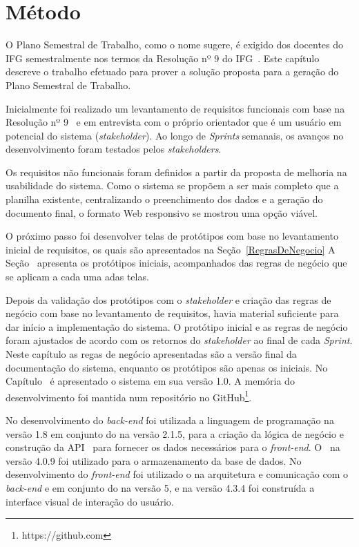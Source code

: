 \chapter{Método}
\label{Metodo}
\indent

O Plano Semestral de Trabalho, como o nome sugere, é exigido dos docentes do \ac{IFG} semestralmente nos termos da Resolução nº 9 do \ac{IFG}~\citep{resolucao}.
Este capítulo descreve o trabalho efetuado para prover a solução proposta para a geração do Plano Semestral de Trabalho.

Inicialmente foi realizado um levantamento de requisitos funcionais com base na Resolução nº 9~\citep{resolucao} e em entrevista com o próprio orientador que é um usuário em potencial do sistema (\textit{stakeholder}).
Ao longo de \textit{Sprints} semanais, os avanços no desenvolvimento foram testados pelos \textit{stakeholders}.

Os requisitos não funcionais foram definidos a partir da proposta de melhoria na usabilidade do sistema. 
Como o sistema se propõem a ser mais completo que a planilha existente, centralizando o preenchimento dos dados e a geração do documento final, o formato Web responsivo se mostrou uma opção viável.

O próximo passo foi desenvolver telas de protótipos com base no levantamento inicial de requisitos, os quais são apresentados na Seção~\ref{RegrasDeNegocio}
A Seção~ apresenta os protótipos iniciais, acompanhados das regras de negócio que se aplicam a cada uma adas telas.

Depois da validação dos protótipos com o \textit{stakeholder} e criação das regras de negócio com base no levantamento de requisitos, havia material suficiente para dar início a implementação do sistema.
O protótipo inicial e as regras de negócio foram ajustados de acordo com os retornos do \textit{stakeholder} ao final de cada \textit{Sprint}.
Neste capítulo as regas de negócio apresentadas são a versão final da documentação do sistema, enquanto os protótipos são apenas os iniciais.
No Capítulo~ é apresentado o sistema em sua versão 1.0. 
A memória do desenvolvimento foi mantida num repositório no GitHub\footnote{https://github.com}.

No desenvolvimento do \textit{back-end} foi utilizada a linguagem de programação  na versão 1.8 em conjunto do  na versão 2.1.5, para a criação da lógica de negócio e construção da API~ para fornecer os dados necessários para o \textit{front-end}. 
O~ na versão 4.0.9 foi utilizado para o armazenamento da base de dados.
No desenvolvimento do \textit{front-end} foi utilizado o  na arquitetura e comunicação com o \textit{back-end} e em conjunto do  na versão 5,  e  na versão 4.3.4 foi construída a interface visual de interação do usuário.

